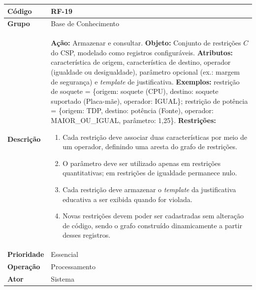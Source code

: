\FloatBarrier
\begin{quadro}[htb]
  \caption{RF-19 -- Armazenar e consultar o conjunto de restrições ($C$)}
  \label{quad:rf19}
  \begin{tabular}{|p{3.2cm}|p{11.8cm}|}
    \hline
    \textbf{Código}     & RF-19                                                                                                                    \\ \hline
    \textbf{Grupo}      & Base de Conhecimento                                                                                                     \\ \hline
    \textbf{Descrição}  &
    \textbf{Ação:} Armazenar e consultar.
    \textbf{Objeto:} Conjunto de restrições $C$ do CSP, modelado como registros configuráveis.
    \textbf{Atributos:} característica de origem, característica de destino, operador (igualdade ou desigualdade), parâmetro opcional (ex.: margem de segurança) e \textit{template} de justificativa.
    \textbf{Exemplos:} restrição de soquete = \{origem: soquete (CPU), destino: soquete suportado (Placa-mãe), operador: IGUAL\}; restrição de potência = \{origem: TDP, destino: potência (Fonte), operador: MAIOR\_OU\_IGUAL, parâmetro: 1,25\}.
    \textbf{Restrições:}
    \begin{enumerate}[nosep,leftmargin=1.2em,topsep=2pt,partopsep=0pt,parsep=0pt,itemsep=1pt]
      \item Cada restrição deve associar duas características por meio de um operador, definindo uma aresta do grafo de restrições.
      \item O parâmetro deve ser utilizado apenas em restrições quantitativas; em restrições de igualdade permanece nulo.
      \item Cada restrição deve armazenar o \textit{template} da justificativa educativa a ser exibida quando for violada.
      \item Novas restrições devem poder ser cadastradas sem alteração de código, sendo o grafo construído dinamicamente a partir desses registros.
    \end{enumerate} \\ \hline
    \textbf{Prioridade} & Essencial                                                                                                                \\ \hline
    \textbf{Operação}   & Processamento                                                                                                            \\ \hline
    \textbf{Ator}       & Sistema                                                                                                                  \\ \hline
  \end{tabular}
\end{quadro}

